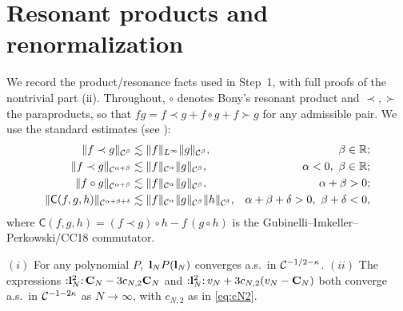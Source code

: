 \section*{Resonant products and renormalization}

We record the product/resonance facts used in Step~1, with full proofs of the
nontrivial part (ii). Throughout, $\circ$ denotes Bony's resonant product and
$\prec,\succ$ the para\-products, so that $fg=f\prec g+f\circ g+f\succ g$ for any
admissible pair. We use the standard estimates (see \cite{CC18,Hairer14}):
\begin{align}
\|f\prec g\|_{\mathcal{C}^{\beta}}&\lesssim\|f\|_{L^\infty}\|g\|_{\mathcal{C}^{\beta}}, &\beta\in\mathbb{R};\label{eq:para1}\\
\|f\prec g\|_{\mathcal{C}^{\alpha+\beta}}&\lesssim\|f\|_{\mathcal{C}^{\alpha}}\|g\|_{\mathcal{C}^{\beta}}, &\alpha<0,\ \beta\in\mathbb{R};\label{eq:para2}\\
\|f\circ g\|_{\mathcal{C}^{\alpha+\beta}}&\lesssim\|f\|_{\mathcal{C}^{\alpha}}\|g\|_{\mathcal{C}^{\beta}}, &\alpha+\beta>0;\label{eq:res}\\
\|\mathsf C(f,g,h)\|_{\mathcal{C}^{\alpha+\beta+\delta}}&\lesssim\|f\|_{\mathcal{C}^{\alpha}}\|g\|_{\mathcal{C}^{\beta}}\|h\|_{\mathcal{C}^{\delta}}, &\alpha+\beta+\delta>0,\ \beta+\delta<0,\label{eq:comm}
\end{align}
where $\mathsf C(f,g,h)=(f\prec g)\circ h-f\,(g\circ h)$ is the Gubinelli--Imkeller--Perkowski/CC18 commutator.

\begin{qonelemma}\label{lem:std}
$(i)$ For any polynomial $P$, $\,\mathbf{l}_N P(\mathbf{l}_N)$ converges a.s.\ in
$\mathcal{C}^{-1/2-\kappa}$. $(ii)$ The expressions ${:}\mathbf{l}_N^2{:}\,\mathbf{C}_N-3c_{N,2}\mathbf{C}_N$
and ${:}\mathbf{l}_N^2{:}\,v_N+3c_{N,2}(v_N-\mathbf{C}_N)$ both converge a.s.\ in
$\mathcal{C}^{-1-2\kappa}$ as $N\to\infty$, with $c_{N,2}$ as in \eqref{eq:cN2}.
\end{qonelemma}

